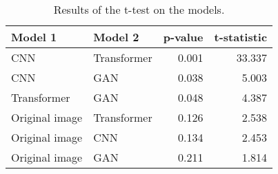 \begin{table}
\centering
\caption{Results of the t-test on the models.}
\label{tab:ttest}
\begin{tabular}{llrr}
\toprule
       Model 1 &     Model 2 &  p-value &  t-statistic \\
\midrule
           CNN & Transformer &    0.001 &       33.337 \\
           CNN &         GAN &    0.038 &        5.003 \\
   Transformer &         GAN &    0.048 &        4.387 \\
Original image & Transformer &    0.126 &        2.538 \\
Original image &         CNN &    0.134 &        2.453 \\
Original image &         GAN &    0.211 &        1.814 \\
\bottomrule
\end{tabular}
\end{table}
